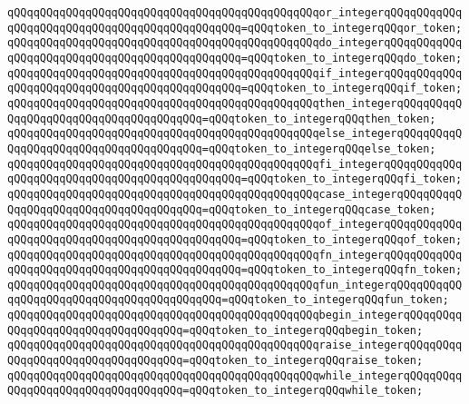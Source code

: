\verb|qQQqqQQqqQQqqQQqqQQqqQQqqQQqqQQqqQQqqQQqqQQqqQQqor_integerqQQqqQQqqQQqqQQqqQQqqQQqqQQqqQQqqQQqqQQqqQQqqQQq=qQQqtoken_to_integerqQQqor_token;|\newline
\newline
\verb|qQQqqQQqqQQqqQQqqQQqqQQqqQQqqQQqqQQqqQQqqQQqqQQqdo_integerqQQqqQQqqQQqqQQqqQQqqQQqqQQqqQQqqQQqqQQqqQQqqQQq=qQQqtoken_to_integerqQQqdo_token;|\newline
\verb|qQQqqQQqqQQqqQQqqQQqqQQqqQQqqQQqqQQqqQQqqQQqqQQqif_integerqQQqqQQqqQQqqQQqqQQqqQQqqQQqqQQqqQQqqQQqqQQqqQQq=qQQqtoken_to_integerqQQqif_token;|\newline
\verb|qQQqqQQqqQQqqQQqqQQqqQQqqQQqqQQqqQQqqQQqqQQqqQQqthen_integerqQQqqQQqqQQqqQQqqQQqqQQqqQQqqQQqqQQqqQQq=qQQqtoken_to_integerqQQqthen_token;|\newline
\verb|qQQqqQQqqQQqqQQqqQQqqQQqqQQqqQQqqQQqqQQqqQQqqQQqelse_integerqQQqqQQqqQQqqQQqqQQqqQQqqQQqqQQqqQQqqQQq=qQQqtoken_to_integerqQQqelse_token;|\newline
\verb|qQQqqQQqqQQqqQQqqQQqqQQqqQQqqQQqqQQqqQQqqQQqqQQqfi_integerqQQqqQQqqQQqqQQqqQQqqQQqqQQqqQQqqQQqqQQqqQQqqQQq=qQQqtoken_to_integerqQQqfi_token;|\newline
\verb|qQQqqQQqqQQqqQQqqQQqqQQqqQQqqQQqqQQqqQQqqQQqqQQqcase_integerqQQqqQQqqQQqqQQqqQQqqQQqqQQqqQQqqQQqqQQq=qQQqtoken_to_integerqQQqcase_token;|\newline
\verb|qQQqqQQqqQQqqQQqqQQqqQQqqQQqqQQqqQQqqQQqqQQqqQQqof_integerqQQqqQQqqQQqqQQqqQQqqQQqqQQqqQQqqQQqqQQqqQQqqQQq=qQQqtoken_to_integerqQQqof_token;|\newline
\newline
\verb|qQQqqQQqqQQqqQQqqQQqqQQqqQQqqQQqqQQqqQQqqQQqqQQqfn_integerqQQqqQQqqQQqqQQqqQQqqQQqqQQqqQQqqQQqqQQqqQQqqQQq=qQQqtoken_to_integerqQQqfn_token;|\newline
\verb|qQQqqQQqqQQqqQQqqQQqqQQqqQQqqQQqqQQqqQQqqQQqqQQqfun_integerqQQqqQQqqQQqqQQqqQQqqQQqqQQqqQQqqQQqqQQqqQQq=qQQqtoken_to_integerqQQqfun_token;|\newline
\verb|qQQqqQQqqQQqqQQqqQQqqQQqqQQqqQQqqQQqqQQqqQQqqQQqbegin_integerqQQqqQQqqQQqqQQqqQQqqQQqqQQqqQQqqQQq=qQQqtoken_to_integerqQQqbegin_token;|\newline
\verb|qQQqqQQqqQQqqQQqqQQqqQQqqQQqqQQqqQQqqQQqqQQqqQQqraise_integerqQQqqQQqqQQqqQQqqQQqqQQqqQQqqQQqqQQq=qQQqtoken_to_integerqQQqraise_token;|\newline
\verb|qQQqqQQqqQQqqQQqqQQqqQQqqQQqqQQqqQQqqQQqqQQqqQQqwhile_integerqQQqqQQqqQQqqQQqqQQqqQQqqQQqqQQqqQQq=qQQqtoken_to_integerqQQqwhile_token;|\newline

